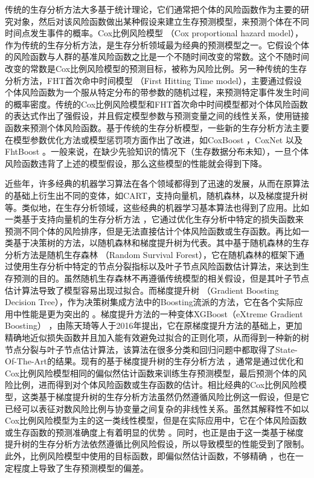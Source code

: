传统的生存分析方法大多基于统计理论，它们通常把个体的风险函数作为主要的研究对象，然后对该风险函数做出某种假设来建立生存预测模型，来预测个体在不同时间点发生事件的概率。Cox比例风险模型 （Cox proportional hazard model），作为传统的生存分析方法，是生存分析领域最为经典的预测模型之一。它假设个体的风险函数与人群的基准风险函数之比是一个不随时间改变的常数。这个不随时间改变的常数是Cox比例风险模型的预测目标，被称为风险比例。另一种传统的生存分析方法，FHT首次命中时间模型 （First Hitting Time model），主要通过假设个体风险函数为一个服从特定分布的带参数的随机过程，来预测特定事件发生时间的概率密度。传统的Cox比例风险模型和FHT首次命中时间模型都对个体风险函数的表达式作出了强假设，并且假定模型参数与预测变量之间的线性关系，使用链接函数来预测个体风险函数。基于传统的生存分析模型，一些新的生存分析方法主要在模型参数优化方法或模型惩罚项方面作出了改进，如CoxBoost ，CoxNet 以及FhtBoost 。一般来说，在缺少先验知识的情况下（生存数据分布未知），一旦个体风险函数违背了上述的模型假设，那么这些模型的性能就会得到下降。

近些年，许多经典的机器学习算法在各个领域都得到了迅速的发展，从而在原算法的基础上衍生出不同的变体，如CART，支持向量机，随机森林，以及梯度提升树等。类似地，在生存分析领域，这些经典的机器学习基本算法也得到了应用。比如一类基于支持向量机的生存分析方法 ，它通过优化生存分析中特定的损失函数来预测不同个体的风险排序，但是无法直接估计个体风险函数或生存函数。再比如一类基于决策树的方法，以随机森林和梯度提升树为代表。其中基于随机森林的生存分析方法是随机生存森林 （Random Survival Forest），它在随机森林的框架下通过使用生存分析中特定的节点分裂指标以及叶子节点风险函数估计算法，来达到生存预测的目的。虽然随机生存森林不再遵循传统模型的相关假设，但是其叶子节点估计算法导致了模型容易出现过拟合。而梯度提升树 （Gradient Boosting Decision Tree），作为决策树集成方法中的Boosting流派的方法，它在各个实际应用中性能是更为突出的 。梯度提升方法的一种变体XGBoost（eXtreme Gradient Boosting） ，由陈天琦等人于2016年提出，它在原梯度提升方法的基础上，更加精确地近似损失函数并且加入能有效避免过拟合的正则化项，从而得到一种新的树节点分裂与叶子节点估计算法，该算法在很多分类和回归问题中都取得了State-Of-The-Art的结果。现有的基于梯度提升树的生存分析方法 ，通常是通过优化和Cox比例风险模型相同的偏似然估计函数来训练生存预测模型，最后预测个体的风险比例，进而得到对个体风险函数或生存函数的估计。相比经典的Cox比例风险模型，这类基于梯度提升树的生存分析方法虽然仍然遵循风险比例这一假设，但是它已经可以表征对数风险比例与协变量之间复杂的非线性关系。虽然其解释性不如以Cox比例风险模型为主的这一类线性模型，但是在实际应用中，它在个体风险函数或生存函数的预测准确度上有着明显的优势 。同时，也正是由于这一类基于梯度提升树的生存分析方法依然遵循比例风险假设，所以导致模型的性能受到了限制。此外，比例风险模型中使用的目标函数，即偏似然估计函数，不够精确 ，也在一定程度上导致了生存预测模型的偏差。
    
